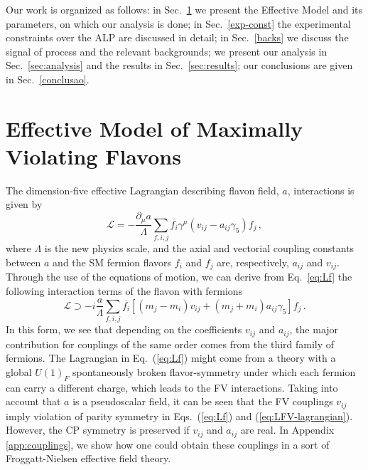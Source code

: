 \documentclass[prd,amsfonts,onecolumn,superscriptaddress,aps,nofootinbib,11pt]{revtex4-1}
\begin{document}
Our work is organized as follows: in Sec.~\ref{sec:model} we present the Effective Model and its parameters, on which our analysis is done; in Sec.~\ref{exp-const} the experimental constraints over the ALP are discussed in detail; in Sec.~\ref{backs} we discuss the signal of process and the relevant backgrounds; we present our analysis in Sec.~\ref{sec:analysis} and the results in Sec.~\ref{sec:results}; our conclusions are given in Sec.~\ref{conclusao}.



\section{Effective Model of Maximally Violating Flavons}
\label{sec:model}

The dimension-five effective Lagrangian describing flavon field, $a$, interactions is given by \cite{Cornella:2019uxs} 
\begin{equation}
    \mathcal{L} = - \frac{\partial_\mu a}{\Lambda} \sum_{f, i, j} \overline{f_i} \gamma^\mu (v_{ij} - a_{ij}\gamma_5) f_j \,,
    \label{eq:Lf}
\end{equation}
where $\Lambda$ is the new physics scale, and the axial and vectorial coupling constants between $a$ and the SM fermion flavors $f_i$ and $f_j$ are, respectively, $a_{ij}$ and $v_{ij}$. Through the use of the equations of motion, we can derive from Eq.~\eqref{eq:Lf} the following interaction terms of the flavon with fermions 
\begin{equation}
\label{eq:LFV-lagrangian}
    \mathcal{L} \supset -i \frac{a}{\Lambda} \sum_{f, i, j} \overline{f_i} \left[ (m_j - m_i) v_{ij} +  (m_j + m_i) a_{ij} \gamma_5 \right] f_j \,.
\end{equation}
In this form, we see that depending on the coefficients $v_{ij}$ and $a_{ij}$, the major contribution for couplings of the same order comes from the third family of fermions. The Lagrangian in Eq.~(\ref{eq:Lf}) might come from a theory with a global $U(1)_F$ spontaneously broken flavor-symmetry  under which each fermion can carry a different charge, which leads to the FV interactions. Taking into account that $a$ is a pseudoscalar field, it can be seen that the FV couplings $v_{ij}$ imply violation of parity symmetry in Eqs.~(\ref{eq:Lf}) and (\ref{eq:LFV-lagrangian}). However, the CP symmetry is preserved if $v_{ij}$ and $a_{ij}$ are real. In Appendix \ref{app:couplings}, we show how one could obtain these couplings in a sort of Froggatt-Nielsen effective field theory. 
\end{document}

